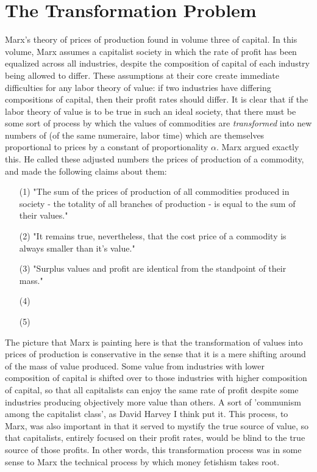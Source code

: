 \section{The Transformation Problem}
 Marx's theory of prices of production found in volume three of capital. In this volume, Marx assumes a capitalist society in which the rate of profit has been equalized across all industries, despite the composition of capital of each industry being allowed to differ. These assumptions at their core create immediate difficulties for any labor theory of value: if two industries have differing compositions of capital, then their profit rates should differ. It is clear that if the labor theory of value is to be true in such an ideal society, that there must be some sort of process by which the values of commodities are \emph{transformed} into new numbers of (of the same numeraire, labor time) which are themselves proportional to prices by a constant of proportionality $\alpha$. Marx argued exactly this. He called these adjusted numbers the prices of production of a commodity, and made the following claims about them: 
\begin{itemize}
	\item[(1)] "The sum of the prices of production of all commodities produced in society - the totality of all branches of production - is equal to the sum of their values."
	\item[(2)] "It remains true, nevertheless, that the cost price of a commodity is always smaller than it's value."
	\item[(3)] "Surplus values and profit are identical from the standpoint of their mass."
	\item[(4)]
	\item[(5)]
\end{itemize}
The picture that Marx is painting here is that the transformation of values into prices of production is conservative in the sense that it is a mere shifting around of the mass of value produced. Some value from industries with lower composition of capital is shifted over to those industries with higher composition of capital, so that all capitalists can enjoy the same rate of profit despite some industries producing objectively more value than others. A sort of 'communism among the capitalist class', as David Harvey I think put it. This process, to Marx, was also important in that it served to mystify the true source of value, so that capitalists, entirely focused on their profit rates, would be blind to the true source of those profits. In other words, this transformation process was in some sense to Marx the technical process by which money fetishism takes root. \par
